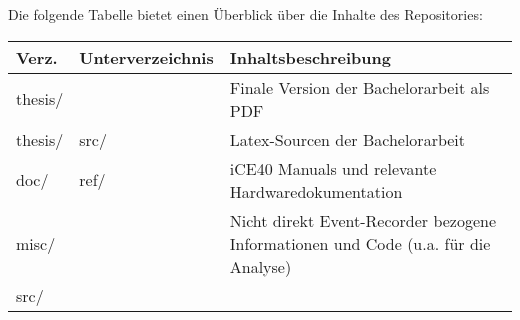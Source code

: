 Die folgende Tabelle bietet einen Überblick über die Inhalte des Repositories:
\begin{table}[h]
\centering

\begin{tabular}{|p{1cm}|p{3cm}|p{10cm}|}
\hline
\rowcolor[HTML]{C0C0C0} 
Verz. & Unterverzeichnis                & Inhaltsbeschreibung                                                                                                                                                                                                                                                                                                      \\ \hline
thesis/     &                                 & Finale Version der Bachelorarbeit als PDF                                                                                                                                                                                                                                                             \\ \hline
thesis/     & src/                            & Latex-Sourcen der Bachelorarbeit                                                                                                                                                                                                                                                              \\ \hline
doc/        & ref/                            & iCE40 Manuals und relevante Hardwaredokumentation                                                                                                                                                                                                                                                                        \\ \hline
misc/       &                                 & Nicht direkt Event-Recorder bezogene Informationen und  Code (u.a. für die Analyse)                                                                                                                                                                                                                                                             \\ \hline
src/        &                                 &                                                                                                                                                                                                                                                                                                                          \\ \hline

\end{tabular}
\end{table}
